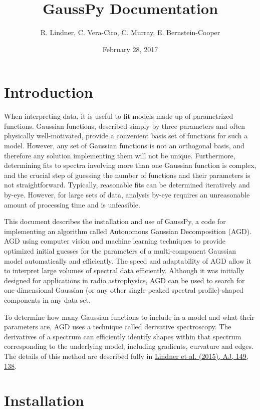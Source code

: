 \documentclass[letterpaper,10pt,openany,oneside]{sphinxmanual}
\title{GaussPy Documentation}
\date{February 28, 2017}
\author{R. Lindner, C. Vera-Ciro, C. Murray, E. Bernstein-Cooper}
\begin{document}
\maketitle
\tableofcontents
{}\label{index::doc}



\chapter{Introduction}
\label{intro:welcome-to-gausspy-s-documentation}\label{intro:introduction}\label{intro:intro}\label{intro::doc}
When interpreting data, it is useful to fit models made up of parametrized functions.  Gaussian functions, described simply by three parameters and often physically well-motivated, provide a convenient basis set of functions for such a model. However, any set of Gaussian functions is not an orthogonal basis, and therefore any solution implementing them will not be unique. Furthermore, determining fits to spectra involving more than one Gaussian function is complex, and the crucial step of guessing the number of functions and their parameters is not straightforward. Typically, reasonable fits can be determined iteratively and by-eye. However, for large sets of data, analysis by-eye requires an unreasonable amount of processing time and is unfeasible.

This document describes the installation and use of GaussPy, a code for implementing an algorithm called Autonomous Gaussian Decomposition (AGD). AGD using computer vision and machine learning techniques to provide optimized initial guesses for the parameters of a multi-component Gaussian model automatically and efficiently. The speed and adaptability of AGD allow it to interpret large volumes of spectral data efficiently. Although it was initially designed for applications in radio astrophysics, AGD can be used to search for one-dimensional Gaussian (or any other single-peaked spectral profile)-shaped components in any data set.

To determine how many Gaussian functions to include in a model and what their parameters are, AGD uses a technique called derivative spectroscopy. The derivatives of a spectrum can efficiently identify shapes within that spectrum corresponding to the underlying model, including gradients, curvature and edges. The details of this method are described fully in \href{http://iopscience.iop.org/article/10.1088/0004-6256/149/4/138/meta}{Lindner et al. (2015), AJ, 149, 138}.


\chapter{Installation}
\label{install:installation}\label{install::doc}\label{install:install}
\end{document}
